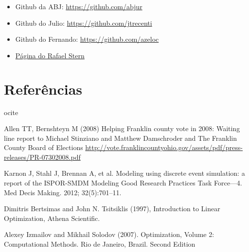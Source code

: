 \documentclass[]{book}
\providecommand{\tightlist}{%
  \setlength{\itemsep}{0pt}\setlength{\parskip}{0pt}}
\begin{document}
\begin{itemize}
\tightlist
\item
  Github da ABJ: \url{https://github.com/abjur}
\item
  Github do Julio: \url{https://github.com/jtrecenti}
\item
  Github do Fernando: \url{https://github.com/azeloc}
\item
  \href{http://www.somos.ufscar.br/professores/view/3477}{Página do
  Rafael Stern}
\end{itemize}

\chapter{Referências}\label{referencias}

ocite

Allen TT, Bernshteyn M (2008) Helping Franklin county vote in 2008:
Waiting line report to Michael Stinziano and Matthew Damschroder and The
Franklin County Board of Elections
\url{http://vote.franklincountyohio.gov/assets/pdf/press-releases/PR-07302008.pdf}

Karnon J, Stahl J, Brennan A, et al. Modeling using discrete event
simulation: a report of the ISPOR-SMDM Modeling Good Research Practices
Task Force---4. Med Decis Making. 2012; 32(5):701--11.

Dimitris Bertsimas and John N. Tsitsiklis (1997), Introduction to Linear
Optimization, Athena Scientific.

Alexey Izmailov and Mikhail Solodov (2007). Optimization, Volume 2:
Computational Methods. Rio de Janeiro, Brazil. Second Edition


\end{document}

